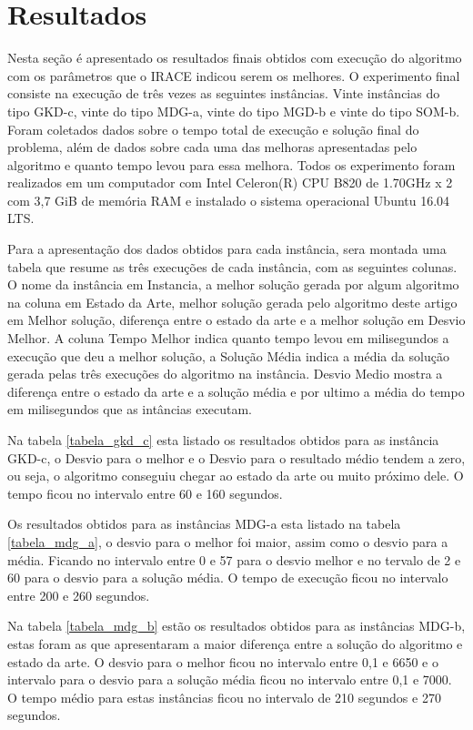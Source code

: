 \documentclass[12pt]{article}
\begin{document}
\section{Resultados}

Nesta seção é apresentado os resultados finais obtidos com execução do algoritmo com os parâmetros que o IRACE indicou serem os melhores. O experimento final consiste na execução de três vezes as seguintes instâncias. Vinte instâncias do tipo GKD-c, vinte do tipo MDG-a, vinte do tipo MGD-b e vinte do tipo SOM-b. Foram coletados dados sobre o tempo total de execução e solução final do problema, além de dados sobre cada uma das melhoras apresentadas pelo algoritmo e quanto tempo levou para essa melhora. Todos os experimento foram realizados em um computador com Intel Celeron(R) CPU B820 de 1.70GHz x 2 com 3,7 GiB de memória RAM e instalado o sistema operacional Ubuntu 16.04 LTS.

Para a apresentação dos dados obtidos para cada instância, sera montada uma tabela que resume as três execuções de cada instância, com as seguintes colunas. O nome da instância em Instancia, a melhor solução gerada por algum algoritmo na coluna em Estado da Arte, melhor solução gerada pelo algoritmo deste artigo em Melhor solução, diferença entre o estado da arte e a melhor solução em Desvio Melhor. A coluna Tempo Melhor indica quanto tempo levou em milisegundos a execução que deu a melhor solução, a Solução Média indica a média da solução gerada pelas três execuções do algoritmo na instância. Desvio Medio mostra a diferença entre o estado da arte e a solução média e por ultimo a média do tempo em milisegundos que as intâncias executam.

Na tabela \ref{tabela_gkd_c} esta listado os resultados obtidos para as instância GKD-c, o Desvio para o melhor e o Desvio para o resultado médio tendem a zero, ou seja, o algoritmo conseguiu chegar ao estado da arte ou muito próximo dele. O tempo ficou no intervalo entre 60 e 160 segundos.

Os resultados obtidos para as instâncias MDG-a esta listado na tabela \ref{tabela_mdg_a}, o desvio para o melhor foi maior, assim como o desvio para a média. Ficando no intervalo entre 0 e 57 para o desvio melhor e no tervalo de 2 e 60 para o desvio para a solução média. O tempo de execução ficou no intervalo entre 200 e 260 segundos.

Na tabela \ref{tabela_mdg_b} estão os resultados obtidos para as instâncias MDG-b, estas foram as que apresentaram a maior diferença entre a solução do algoritmo e estado da arte. O desvio para o melhor ficou no intervalo entre 0,1 e 6650 e o intervalo para o desvio para a solução média ficou no intervalo entre 0,1 e 7000. O tempo médio para estas instâncias ficou no intervalo de 210 segundos e 270 segundos.
\end{document}
